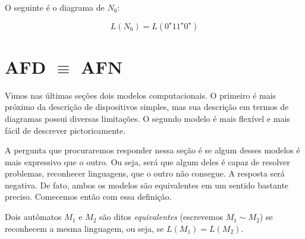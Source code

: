 \begin{example}
  O seguinte é o diagrama de $N_6$:

  \begin{center}
  \end{center}
\begin{displaymath}
  L(N_6) = L(0^\star11^\star0^\star)
\end{displaymath}
\end{example}

\section{AFD $\equiv$ AFN}
\label{sec:afn-afd}

Vimos nas últimas seções dois modelos computacionais.
O primeiro é mais próximo da descrição de dispositivos simples, mas sua descrição em termos de diagramas possui diversas limitações.
O segundo modelo é mais flexível e mais fácil de descrever pictoricamente.

A pergunta que procuraremos responder nessa seção é se algum desses modelos é mais expressivo que o outro.
Ou seja, será que algum deles é capaz de resolver problemas, reconhecer linguagens, que o outro não consegue.
A resposta será negativa.
De fato, ambos os modelos são equivalentes em um sentido bastante preciso.
Comecemos então com essa definição.

Dois autômatos $M_1$ e $M_2$ são ditos {\em equivalentes} (escrevemos $M_1 \sim M_2$) se reconhecem a mesma linguagem, ou seja, se $L(M_1) = L(M_2)$.

